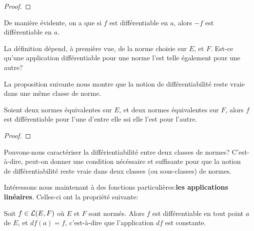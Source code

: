\begin{proof}
	
\end{proof}

De manière évidente, on a que si $f$ est différentiable en $a$, alors $-f$ est
différentiable en $a$.

La définition dépend, à première vue, de la norme choisie sur $E$, et $F$. Est-ce
qu'une application différentiable pour une norme l'est telle également pour une
autre?

La proposition suivante nous montre que la notion de différentiabilité reste
vraie dans une même classe de norme.

\begin{proposition}
	Soient deux normes équivalentes sur $E$, et deux normes équivalentes sur
	$F$, alors $f$ est différentiable pour l'une d'entre elle ssi elle l'est
	pour l'autre.
\end{proposition}

\begin{proof}
	
\end{proof}

\begin{question}
	Pouvons-nous caractériser la différientiabilité entre deux classes de
	normes? C'est-à-dire, peut-on donner une condition nécéssaire et suffisante
	pour que la notion de différentiabilité reste vraie dans deux classes (ou
	sous-classes) de normes.
\end{question}



Intéressons nous maintenant à des fonctions particulières:\textbf{les applications
linéaires}.
Celles-ci ont la propriété suivante:

\begin{proposition}
	Soit $f \in \mathcal{L}(E, F)$ où $E$ et $F$ sont normés. Alors $f$ est
	différentiable en tout point $a$ de $E$, et $df(a) = f$, c'est-à-dire que
	l'application $df$ est constante.
\end{proposition}

